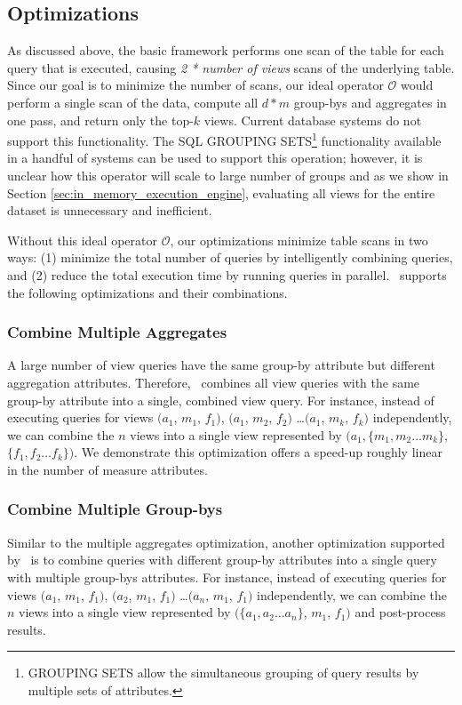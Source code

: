 \subsection{Optimizations} 
\label{sec:dbms_optimizations}
As discussed above, the basic framework performs one scan of the table for each
query that is executed, causing {\it 2 * number of views} scans of the
underlying table. Since our goal is to minimize the number of scans, our ideal
operator $\mathcal{O}$ would perform a single scan of the data, compute all
$d*m$ group-bys and aggregates in one pass, and return only the top-$k$
views.
Current database systems do not support this functionality. 
The SQL GROUPING SETS\footnote{GROUPING SETS allow the simultaneous
  grouping of query results by multiple sets of attributes.} functionality
  available in a handful of systems can be used to support this operation;
  however, it is unclear how this operator will scale to large number of groups
  and as we show in Section \ref{sec:in_memory_execution_engine}, evaluating all
  views for the entire dataset is unnecessary and inefficient.

Without this ideal operator $\mathcal{O}$,
our optimizations minimize table scans in two ways: (1) minimize the total number of
queries by intelligently combining queries, and (2) reduce the total
execution time by running queries in parallel. \VizRecDB\ supports the following
optimizations and their combinations.

\subsubsection {Combine Multiple Aggregates} 
A large number of view queries have the same group-by attribute but different
aggregation attributes. 
Therefore, \VizRecDB\ combines all view queries with the same
group-by attribute into a single, combined view query. For instance, instead of executing
queries for views $(a_1$, $m_1$, $f_1)$, $(a_1$, $m_2$, $f_2)$ \ldots $(a_1$, $m_k$, $f_k)$
independently, we can combine the $n$ views into a single view represented by
$(a_1, \{m_1, m_2\ldots m_k\}$, $\{f_1, f_2\ldots f_k\})$. We demonstrate this
optimization offers a speed-up roughly linear in the number of measure
attributes.

\subsubsection {Combine Multiple Group-bys}
\label{subsec:mult_gb}
  Similar to the multiple aggregates optimization, another optimization
  supported by \VizRecDB\ is to combine queries with different group-by attributes
  into a single query with multiple group-bys attributes.
  For instance, instead of executing queries for views $(a_1$, $m_1$, $f_1)$,
  $(a_2$, $m_1$, $f_1)$ \ldots $(a_n$, $m_1$, $f_1)$ independently, we can
  combine the $n$ views into a single view represented by $(\{a_1, a_2\ldots
  a_n\}$, $m_1$, $f_1)$ and post-process results.

